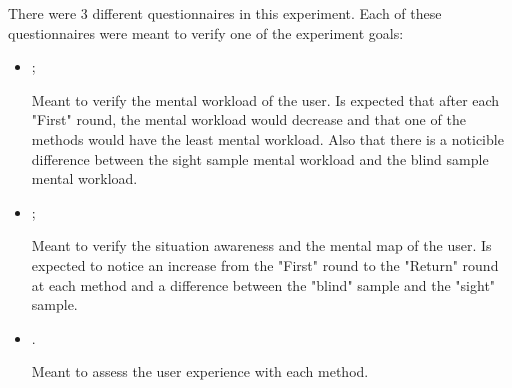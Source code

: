 There were 3 different questionnaires in this experiment. Each of these questionnaires were meant to verify one of the experiment goals:

\begin{itemize}
    \item {};
    
        Meant to verify the mental workload of the user. Is expected that after each "First" round, the mental workload would decrease and that one of the methods would have the least mental workload. Also that there is a noticible difference between the sight sample mental workload and the blind sample mental workload.

    \item {};
    
        Meant to verify the situation awareness and the mental map of the user. Is expected to notice an increase from the "First" round to the "Return" round at each method and a difference between the "blind" sample and the "sight" sample.

    \item {}.

        Meant to assess the user experience with each method.

\end{itemize}






